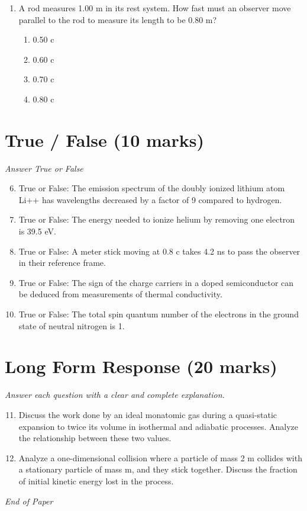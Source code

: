 \documentclass[12pt]{article}
\begin{document}
\begin{enumerate}[label=\arabic*.]
\begin{enumerate}[label=(\alph*)]
    \item 5,000
    \item 10,000
\end{enumerate}
\item A rod measures 1.00 m in its rest system. How fast must an observer move parallel to the rod to measure its length to be 0.80 m?
\begin{enumerate}[label=(\alph*)]
    \item 0.50 c
    \item 0.60 c
    \item 0.70 c
    \item 0.80 c
\end{enumerate}
\end{enumerate}

\section*{True / False (10 marks)}
\textit{Answer True or False}
\begin{enumerate}[label=\arabic*.]
\setcounter{enumi}{5}
\item True or False: The emission spectrum of the doubly ionized lithium atom Li++ has wavelengths decreased by a factor of 9 compared to hydrogen.
\item True or False: The energy needed to ionize helium by removing one electron is 39.5 eV.
\item True or False: A meter stick moving at 0.8 c takes 4.2 ns to pass the observer in their reference frame.
\item True or False: The sign of the charge carriers in a doped semiconductor can be deduced from measurements of thermal conductivity.
\item True or False: The total spin quantum number of the electrons in the ground state of neutral nitrogen is 1.
\end{enumerate}

\section*{Long Form Response (20 marks)}
\textit{Answer each question with a clear and complete explanation.}
\begin{enumerate}[label=\arabic*.]
\setcounter{enumi}{10}
\item Discuss the work done by an ideal monatomic gas during a quasi-static expansion to twice its volume in isothermal and adiabatic processes. Analyze the relationship between these two values.
\item Analyze a one-dimensional collision where a particle of mass 2 m collides with a stationary particle of mass m, and they stick together. Discuss the fraction of initial kinetic energy lost in the process.
\end{enumerate}

\vfill
\noindent\textit{End of Paper}
\end{document}
